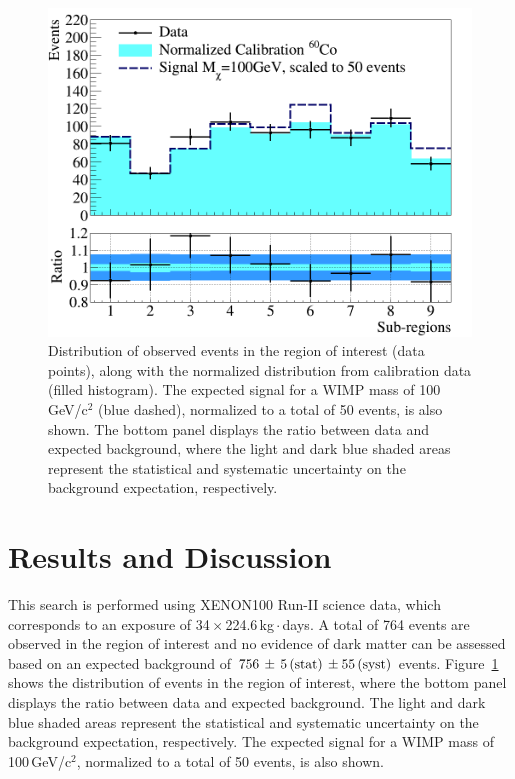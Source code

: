 \begin{figure}[t]
  \includegraphics[width=\linewidth]{data_vs_bkg.png}
  \caption{Distribution of  observed events  in the region of interest (data points), along with the normalized distribution from calibration data (filled histogram). The expected signal for a WIMP mass of 100\,GeV/c$^2$ (blue dashed), normalized to a total of 50 events, is also shown. 
	  The bottom panel displays the ratio between data and expected background, where the light  and dark blue shaded areas represent the statistical and systematic uncertainty on the background expectation, respectively. }
  \label{fig:dataVSbkg}
\end{figure}


\section{Results and Discussion}
\label{sec:results}

This search is performed using XENON100 Run-II science data, which corresponds to an exposure of 34\,$\times$\,224.6\,kg\,$\cdot$\,days. 
A total of 764 events are observed in the region of interest and no evidence of dark matter can be assessed based on an expected background of
$756 \, \pm \, 5 \,{\rm (stat)} \, \pm 55\, {\rm (syst)}$ events. 
Figure~\ref{fig:dataVSbkg} shows the distribution of  events  in the region of interest, where the bottom panel displays the ratio
between data and expected background. The light and dark blue shaded areas represent the statistical and systematic uncertainty 
on the background expectation, respectively. The expected signal for a WIMP mass of 100\,GeV/c$^2$, normalized to a total of 50 events, is also shown.



